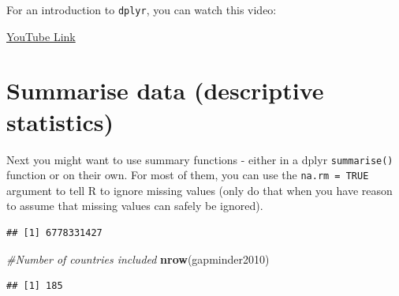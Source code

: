 \documentclass[
]{book}
\newenvironment{Shaded}{\begin{snugshade}}{\end{snugshade}}
\newcommand{\CommentTok}[1]{\textcolor[rgb]{0.56,0.35,0.01}{\textit{#1}}}
\newcommand{\DataTypeTok}[1]{\textcolor[rgb]{0.13,0.29,0.53}{#1}}
\newcommand{\DecValTok}[1]{\textcolor[rgb]{0.00,0.00,0.81}{#1}}
\newcommand{\KeywordTok}[1]{\textcolor[rgb]{0.13,0.29,0.53}{\textbf{#1}}}
\newcommand{\NormalTok}[1]{#1}
\newcommand{\OperatorTok}[1]{\textcolor[rgb]{0.81,0.36,0.00}{\textbf{#1}}}
\newcommand{\OtherTok}[1]{\textcolor[rgb]{0.56,0.35,0.01}{#1}}
\newcommand{\StringTok}[1]{\textcolor[rgb]{0.31,0.60,0.02}{#1}}
\begin{document}
For an introduction to \texttt{dplyr}, you can watch this video:

\textcolor{blue}{\href{https://www.youtube.com/embed/QtQE-b5iMUQ?rel=0&modestbranding=1&loop=1&playlist=sk7TT5qM5Hw}{YouTube Link}}

\hypertarget{summarise-data-descriptive-statistics}{%
\section{Summarise data (descriptive statistics)}\label{summarise-data-descriptive-statistics}}

Next you might want to use summary functions - either in a dplyr \texttt{summarise()} function or on their own. For most of them, you can use the \texttt{na.rm\ =\ TRUE} argument to tell R to ignore missing values (only do that when you have reason to assume that missing values can safely be ignored).

\begin{Shaded}
\end{Shaded}

\begin{verbatim}
## [1] 6778331427
\end{verbatim}

\begin{Shaded}
\begin{Highlighting}[]
\CommentTok{#Number of countries included}
\KeywordTok{nrow}\NormalTok{(gapminder2010)}
\end{Highlighting}
\end{Shaded}

\begin{verbatim}
## [1] 185
\end{verbatim}

\begin{Shaded}
\end{Shaded}
\end{document}
